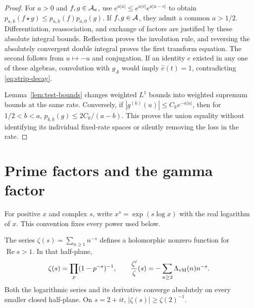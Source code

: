 \begin{proof}
For $a>0$ and $f,g\in\mathcal A_a$, use
$e^{a|u|}\leq e^{a|v|}e^{a|u-v|}$ to obtain
$p_{a,k}(f\star g)\leq p_{a,k}(f)p_{a,0}(g)$.
If $f,g\in\mathcal A$, they admit a common $a>1/2$.
Differentiation, reassociation, and exchange of factors are justified by
these absolute integral bounds.  Reflection proves the involution rule,
and reversing the absolutely convergent double integral proves the first
transform equation.  The second follows from $u\mapsto-u$ and conjugation.
If an identity $e$ existed in any one of these algebras, convolution with
$g_A$ would imply $\widehat e(t)=1$, contradicting \eqref{eq:strip-decay}.

Lemma~\ref{lem:test-bounds} changes weighted $L^1$ bounds into weighted
supremum bounds at the same rate.  Conversely, if
$|g^{(k)}(u)|\leq C_k e^{-a|u|}$, then for $1/2<b<a$,
$p_{b,k}(g)\leq2C_k/(a-b)$.
This proves the union equality without identifying its individual fixed-rate
spaces or silently removing the loss in the rate.
\end{proof}

\section{Prime factors and the gamma factor}
\label{sec:euler-gamma}

For positive $x$ and complex $s$, write $x^s=\exp(s\log x)$ with the real
logarithm of $x$.  This convention fixes every power used below.

\begin{lemma}
\label{lem:euler}
The series $\zeta(s)=\sum_{n\geq1}n^{-s}$ defines a holomorphic nonzero
function for $\operatorname{Re}s>1$.  In that half-plane,
\begin{equation}
 \zeta(s)=\prod_p(1-p^{-s})^{-1},\qquad
 \frac{\zeta'}{\zeta}(s)=-\sum_{n\geq2}\Lambda_{\rm vM}(n)n^{-s}.
 \label{eq:euler}
\end{equation}
Both the logarithmic series and its derivative converge absolutely on every
smaller closed half-plane.  On $s=2+it$, $|\zeta(s)|\geq\zeta(2)^{-1}$.
\end{lemma}

